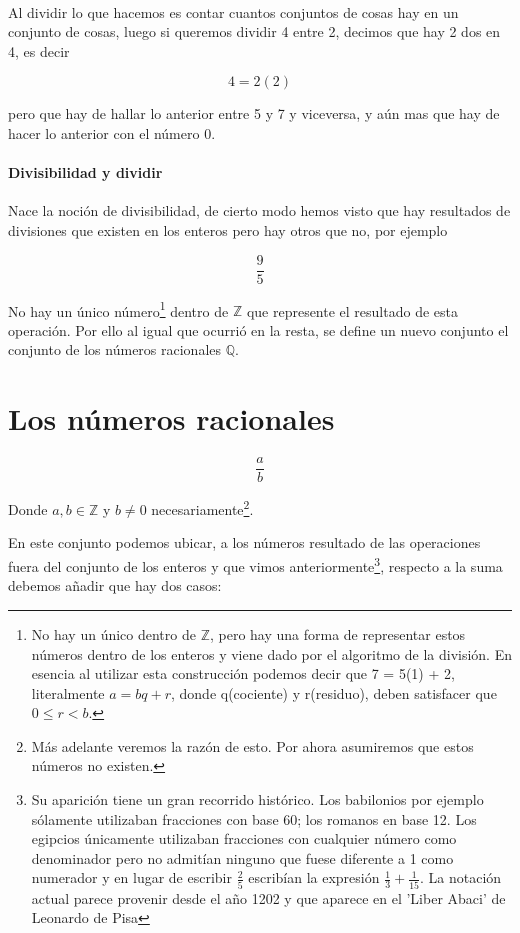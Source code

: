 \documentclass{article}
\begin{document}
\paragraph{}Al dividir lo que hacemos es contar cuantos conjuntos de cosas hay en un conjunto de cosas, luego si queremos dividir 4 entre 2, decimos que hay 2 dos en 4, es decir

$$4 = 2(2)$$

pero que hay de hallar lo anterior entre 5 y 7 y viceversa, y aún mas que hay de hacer lo anterior con el número 0.

\paragraph{Divisibilidad y dividir} Nace la noción de divisibilidad, de cierto modo hemos visto que hay resultados de divisiones que existen en los enteros pero hay otros que no, por ejemplo

$$\frac{9}{5}$$

No hay un único número\footnote{No hay un único dentro de $\mathbb{Z}$, pero hay una forma de representar estos números dentro de los enteros y viene dado por el algoritmo de la división. En esencia al utilizar esta construcción podemos decir que 7 = 5(1) + 2, literalmente $a = bq + r$, donde q(cociente) y r(residuo), deben satisfacer que $0 \leq r<b$.} dentro de $\mathbb{Z}$ que represente el resultado de esta operación. Por ello al igual que ocurrió en la resta, se define un nuevo conjunto el conjunto de los números racionales $\mathbb{Q}$.

\section{Los números racionales}

$$\frac{a}{b}$$

Donde $a, b \in \mathbb{Z}$ y $b \neq 0$ necesariamente\footnote{Más adelante veremos la razón de esto. Por ahora asumiremos que estos números no existen.}.

En este conjunto podemos ubicar, a los números resultado de las operaciones fuera del conjunto de los enteros y que vimos anteriormente\footnote{Su aparición tiene un gran recorrido histórico. Los babilonios por ejemplo sólamente utilizaban fracciones con base 60; los romanos en base 12. Los egipcios únicamente utilizaban fracciones con cualquier número como denominador pero no admitían ninguno que fuese diferente a 1 como numerador y en lugar de escribir $\frac{2}{5}$ escribían la expresión $\frac{1}{3} + \frac{1}{15}$. La notación actual parece provenir desde el año 1202 y que aparece en el 'Liber Abaci' de Leonardo de Pisa\cite{patino_duque_1977}}, respecto a la suma debemos añadir que hay dos casos:
\end{document}
